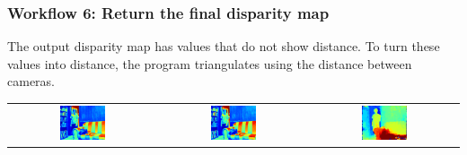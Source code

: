\documentclass[19pt]{beamer}
\begin{document}
\begin{frame}
\frametitle{Workflow 6: Return the final disparity map}
The output disparity map has values that do not show distance. To turn these values into distance, the program triangulates using the distance between cameras.\\[10pt]

\hspace*{-18pt}
\begin{tabular}{ccc}
\includegraphics[width=0.33\textwidth]{images/l.png} &
\includegraphics[width=0.33\textwidth]{images/r.png} &
\includegraphics[width=0.33\textwidth]{images/nomedres.png}
\end{tabular}

\end{frame}
\end{document}

